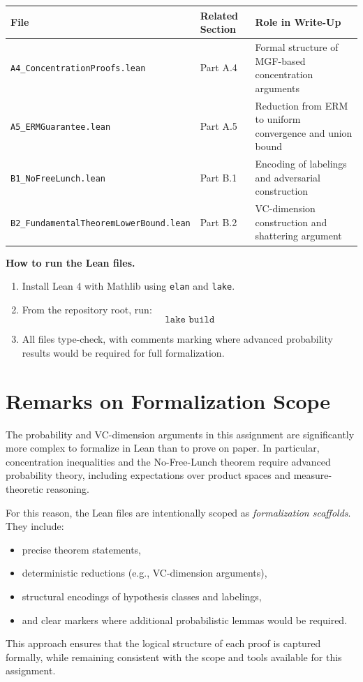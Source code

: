 \documentclass[11pt]{article}
\begin{document}
\begin{center}
\begin{tabular}{lll}
\toprule
\textbf{File} & \textbf{Related Section} & \textbf{Role in Write-Up} \\
\midrule
\texttt{A4\_ConcentrationProofs.lean} 
& Part A.4 
& Formal structure of MGF-based concentration arguments \\

\texttt{A5\_ERMGuarantee.lean} 
& Part A.5 
& Reduction from ERM to uniform convergence and union bound \\

\texttt{B1\_NoFreeLunch.lean} 
& Part B.1 
& Encoding of labelings and adversarial construction \\

\texttt{B2\_FundamentalTheoremLowerBound.lean} 
& Part B.2 
& VC-dimension construction and shattering argument \\
\bottomrule
\end{tabular}
\end{center}

\medskip

\textbf{How to run the Lean files.}
\begin{enumerate}
    \item Install Lean 4 with Mathlib using \texttt{elan} and \texttt{lake}.
    \item From the repository root, run:
    \[
    \texttt{lake build}
    \]
    \item All files type-check, with comments marking where advanced probability results would be required for full formalization.
\end{enumerate}

\section{Remarks on Formalization Scope}
\label{app:remarks}

The probability and VC-dimension arguments in this assignment are significantly more complex 
to formalize in Lean than to prove on paper. In particular, concentration inequalities and the 
No-Free-Lunch theorem require advanced probability theory, including expectations over 
product spaces and measure-theoretic reasoning.

\medskip

For this reason, the Lean files are intentionally scoped as \emph{formalization scaffolds}. 
They include:
\begin{itemize}
    \item precise theorem statements,
    \item deterministic reductions (e.g., VC-dimension arguments),
    \item structural encodings of hypothesis classes and labelings,
    \item and clear markers where additional probabilistic lemmas would be required.
\end{itemize}

\medskip

This approach ensures that the logical structure of each proof is captured formally, while 
remaining consistent with the scope and tools available for this assignment.
\end{document}
